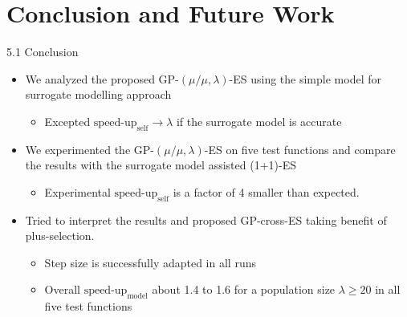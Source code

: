 \documentclass{beamer}
\begin{document}
\section{Conclusion and Future Work}
\begin{frame}{5.1 Conclusion}
  \begin{itemize}
  \item
    We analyzed the proposed GP-$(\mu/\mu,\lambda)$-ES using the simple model for surrogate modelling approach
    \begin{itemize}
        \item Excepted $\text{speed-up}_{\text{self}}\rightarrow \lambda$ if the surrogate model is accurate
    \end{itemize}
  \item
    We experimented the GP-$(\mu/\mu,\lambda)$-ES on five test functions and compare the results with the surrogate model assisted (1+1)-ES
    \begin{itemize}
        \item Experimental $\text{speed-up}_{\text{self}}$ is a factor of 4 smaller than expected. 
    \end{itemize}
  \item
    Tried to interpret the results and proposed GP-cross-ES taking benefit of plus-selection.
    \begin{itemize}
        \item Step size is successfully adapted in all runs
        \item Overall $\text{speed-up}_{\text{model}}$ about 1.4 to 1.6 for a population size $\lambda \geq 20$ in all five test functions
    \end{itemize}
  \end{itemize}
  
\end{frame}
\end{document}
